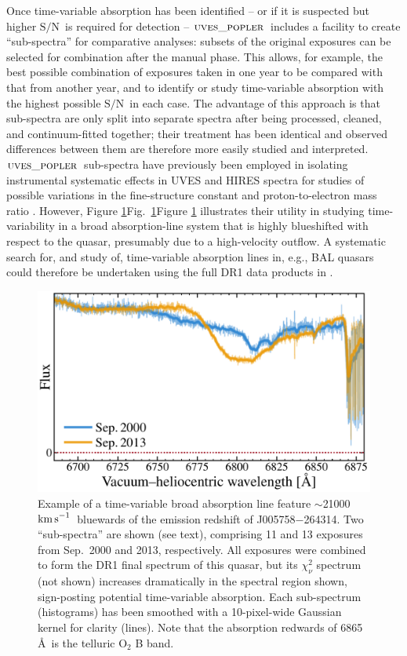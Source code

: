 \documentclass[fleqn,usenatbib,usedcolumn]{mnras}
\newcommand{\Fref}[1]{\ifhmode \ifnum\spacefactor=1001 Figure \ref{#1}\else Fig.\ \ref{#1}\fi \else Figure \ref{#1}\fi}
\newcommand{\kms}{\ensuremath{\textrm{km\,s}^{-1}}}
\newcommand{\SN}{\ensuremath{\textrm{S/N}}}
\newcommand{\popler}{\ensuremath{\textsc{uves\_popler}}}
\begin{document}
Once time-variable absorption has been identified -- or if it is suspected but higher \SN\ is required for detection -- \popler\ includes a facility to create ``sub-spectra'' for comparative analyses: subsets of the original exposures can be selected for combination after the manual phase. This allows, for example, the best possible combination of exposures taken in one year to be compared with that from another year, and to identify or study time-variable absorption with the highest possible \SN\ in each case. The advantage of this approach is that sub-spectra are only split into separate spectra after being processed, cleaned, and continuum-fitted together; their treatment has been identical and observed differences between them are therefore more easily studied and interpreted. \popler\ sub-spectra have previously been employed in isolating instrumental systematic effects in UVES and HIRES spectra for studies of possible variations in the fine-structure constant and proton-to-electron mass ratio \citep[e.g.][]{Dapra:2015:489,Murphy:2016:2461,Murphy:2017:4930}. However, \Fref{f:broadCIV} illustrates their utility in studying time-variability in a broad absorption-line system that is highly blueshifted with respect to the quasar, presumably due to a high-velocity outflow. A systematic search for, and study of, time-variable absorption lines in, e.g., BAL quasars could therefore be undertaken using the full DR1 data products in \citet[][i.e.\ both the final spectrum and the extracted, contributing exposures]{Murphy:2018:UVESSQUADDR1}.

\begin{figure}
\begin{center}
\includegraphics[width=0.90\columnwidth]{DR1_broadCIV.pdf}
\vspace{-1em}
\caption{Example of a time-variable  broad absorption line feature $\sim$21000\,\kms\ bluewards of the emission redshift of J005758$-$264314. Two ``sub-spectra'' are shown (see text), comprising 11 and 13 exposures from Sep.\ 2000 and 2013, respectively. All exposures were combined to form the DR1 final spectrum of this quasar, but its $\chi^2_\nu$ spectrum (not shown) increases dramatically in the spectral region shown, sign-posting potential time-variable absorption. Each sub-spectrum (histograms) has been smoothed with a 10-pixel-wide Gaussian kernel for clarity (lines). Note that the absorption redwards of 6865\,\AA\ is the telluric O$_2$ B band.}
\label{f:broadCIV}
\end{center}
\end{figure}
\end{document}
